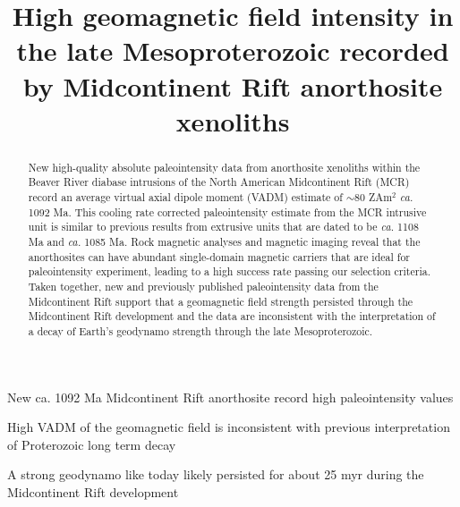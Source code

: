 \documentclass[draft]{agujournal2019}
\begin{document}
\title{High geomagnetic field intensity in the late Mesoproterozoic recorded by Midcontinent Rift anorthosite xenoliths}





\begin{keypoints}
\item New ca. 1092 Ma Midcontinent Rift anorthosite record high paleointensity values
\item High VADM of the geomagnetic field is inconsistent with previous interpretation of Proterozoic long term decay
\item A strong geodynamo like today likely persisted for about 25 myr during the Midcontinent Rift development
\end{keypoints}





\begin{abstract}
New high-quality absolute paleointensity data from anorthosite xenoliths within the Beaver River diabase intrusions of the North American Midcontinent Rift (MCR) record an average virtual axial dipole moment (VADM) estimate of $\sim$80 ZAm$^2$ \textit{ca.} 1092 Ma. This cooling rate corrected paleointensity estimate from the MCR intrusive unit is similar to previous results from extrusive units that are dated to be \textit{ca.} 1108 Ma and \textit{ca.} 1085 Ma. Rock magnetic analyses and magnetic imaging reveal that the anorthosites can have abundant single-domain magnetic carriers that are ideal for paleointensity experiment, leading to a high success rate passing our selection criteria. Taken together, new and previously published paleointensity data from the Midcontinent Rift support that a geomagnetic field strength persisted through the Midcontinent Rift development and the data are inconsistent with the interpretation of a decay of Earth's geodynamo strength through the late Mesoproterozoic. 


\end{abstract}
\end{document}
